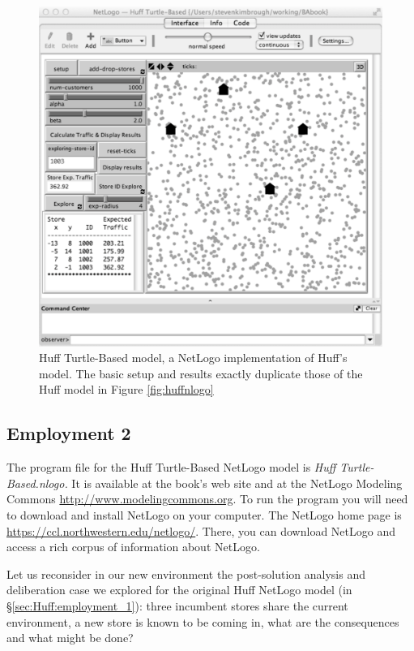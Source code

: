 \begin{figure}[htbp] %
   \centering
   \includegraphics[width=\textwidth]{figures/HuffTurtleStart.pdf}  
   \caption{Huff Turtle-Based model, a NetLogo implementation of Huff's model. The basic setup and results exactly duplicate those of the Huff model in Figure \ref{fig:huffnlogo}} %
   \label{fig:HuffTurtleStart}
\end{figure}

\newpage
\subsection{Employment 2}

The program file for the Huff Turtle-Based NetLogo model is {\it Huff Turtle-Based.nlogo.} It is available at the book's web site and at the NetLogo Modeling Commons 
 \url{http://www.modelingcommons.org}.
 To run the program you will need to download and install NetLogo on your computer.
The NetLogo home page is \url{https://ccl.northwestern.edu/netlogo/}. There, you can download NetLogo and access a rich corpus of information about NetLogo.

Let us reconsider in our new environment  the post-solution analysis and deliberation case we explored for the original Huff NetLogo model (in \S\ref{sec:Huff:employment_1}): three incumbent stores share the current environment, a new store is known to be coming in, what are the consequences and what might be done?  

